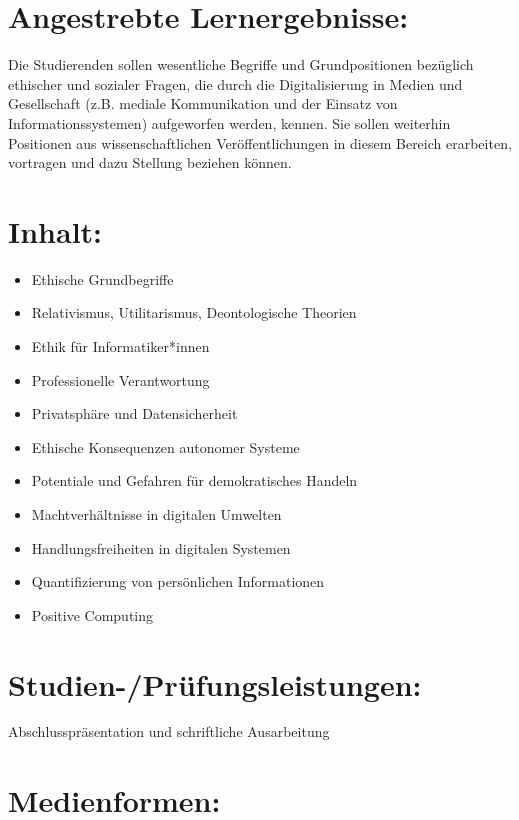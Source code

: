 \section*{Angestrebte
Lernergebnisse:}\label{angestrebte-lernergebnisse}

Die Studierenden sollen wesentliche Begriffe und Grundpositionen
bezüglich ethischer und sozialer Fragen, die durch die Digitalisierung
in Medien und Gesellschaft (z.B. mediale Kommunikation und der Einsatz
von Informationssystemen) aufgeworfen werden, kennen. Sie sollen
weiterhin Positionen aus wissenschaftlichen Veröffentlichungen in diesem
Bereich erarbeiten, vortragen und dazu Stellung beziehen können.

\section*{Inhalt:}\label{inhalt}

\begin{itemize}
\item
  Ethische Grundbegriffe
\item
  Relativismus, Utilitarismus, Deontologische Theorien
\item
  Ethik für Informatiker*innen
\item
  Professionelle Verantwortung
\item
  Privatsphäre und Datensicherheit
\item
  Ethische Konsequenzen autonomer Systeme
\item
  Potentiale und Gefahren für demokratisches Handeln
\item
  Machtverhältnisse in digitalen Umwelten
\item
  Handlungsfreiheiten in digitalen Systemen
\item
  Quantifizierung von persönlichen Informationen
\item
  Positive Computing
\end{itemize}

\section*{Studien-/Prüfungsleistungen:}\label{studien-pruxfcfungsleistungen}

Abschlusspräsentation und schriftliche Ausarbeitung

\section*{Medienformen:}\label{medienformen}

